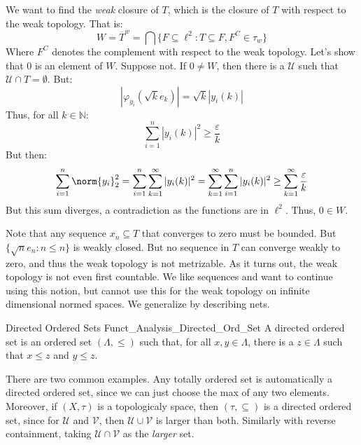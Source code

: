 \begin{lexample}
        We want to find the \textit{weak} closure of $T$, which
        is the closure of $T$ with respect to the weak topology.
        That is:
        \begin{equation}
            W=\overline{T}^{w}=
            \bigcap\{F\subseteq\ell^{2}:
                T\subseteq{F},F^{C}\in\tau_{w}\}
        \end{equation}
        Where $F^{C}$ denotes the complement with respect
        to the weak topology. Let's show that $0$ is an
        element of $W$. Suppose not. If $0\ne{W}$, then
        there is a $\mathcal{U}$ such that
        $\mathcal{U}\cap{T}=\emptyset$. But:
        \begin{equation}
            |\varphi_{y_{i}}(\sqrt{k}e_{k})|=
            \sqrt{k}|y_{i}(k)|
        \end{equation}
        Thus, for all $k\in\mathbb{N}$:
        \begin{equation}
            \sum_{i=1}^{n}|y_{i}(k)|^{2}\geq
            \frac{\varepsilon}{k}
        \end{equation}
        But then:
        \begin{equation}
            \sum_{i=1}^{n}\norm{y_{i}}_{2}^{2}
            =\sum_{i=1}^{n}\sum_{k=1}^{\infty}
                |y_{i}(k)|^{2}
            =\sum_{k=1}^{\infty}\sum_{i=1}^{n}
                |y_{i}(k)|^{2}\geq\sum_{k=1}^{\infty}
                    \frac{\varepsilon}{k}
        \end{equation}
        But this sum diverges, a contradiction as the functions
        are in $\ell^{2}$. Thus, $0\in{W}$.
    \end{lexample}
    Note that any sequence $x_{n}\subseteq{T}$ that converges
    to zero must be bounded. But $\{\sqrt{n}e_{n}:n\leq{n}\}$
    is weakly closed. But no sequence in $T$ can converge weakly
    to zero, and thus the weak topology is not metrizable.
    As it turns out, the weak topology is not even
    first countable. We like sequences and want to continue
    using this notion, but cannot use this for the weak
    topology on infinite dimensional normed spaces. We
    generalize by describing nets.
    \begin{ldefinition}{Directed Ordered Sets}
          {Funct_Analysis_Directed_Ord_Set}
        A directed ordered set is an ordered set
        $(\Lambda,\leq)$ such that, for all $x,y\in\Lambda$,
        there is a $z\in\Lambda$ such that
        $x\leq{z}$ and $y\leq{z}$.
    \end{ldefinition}
    \begin{lexample}
        There are two common examples. Any totally ordered
        set is automatically a directed ordered set,
        since we can just choose the max of any two elements.
        Moreover, if $(X,\tau)$ is a topologicaly space, then
        $(\tau,\subseteq)$ is a directed ordered set, since
        for $\mathcal{U}$ and $\mathcal{V}$, then
        $\mathcal{U}\cup\mathcal{V}$ is larger than both.
        Similarly with reverse containment, taking
        $\mathcal{U}\cap\mathcal{V}$ as the
        \textit{larger} set.
    \end{lexample}
